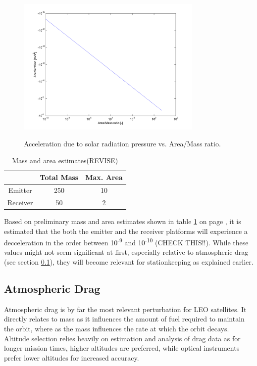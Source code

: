 \begin{figure}[h!]
\centering
\includegraphics[width=0.8\textwidth, angle=0]{img/solPressureVarRatio.png}
\label{fig:solarRadRatio}
\caption{Acceleration due to solar radiation pressure vs. Area/Mass ratio.}
\end{figure}

\begin{table}[h]
	\centering
		\begin{tabular}{c|c|c}
		 & Total Mass & Max. Area \\ \hline \hline
		 Emitter & 250 & 10 \\ 
		 Receiver & 50 & 2 
			
		\end{tabular}
	\caption{Mass and area estimates(REVISE)}
	\label{table:solarEstimates}
\end{table}

Based on preliminary mass and area estimates shown in table \ref{table:solarEstimates} on page \pageref{table:solarEstimates}, it is estimated that the both the emitter and the receiver platforms will experience a decceleration in the order between 10\textsuperscript{-9} and 10\textsuperscript{-10} (CHECK THIS!!). While these values might not seem significant at first, especially relative to atmospheric drag (see section \ref{mtrAtmDrag}), they will become relevant for stationkeeping as explained earlier.

\subsection{Atmospheric Drag}
\label{mtrAtmDrag}

Atmospheric drag is by far the most relevant perturbation for \ac{LEO} satellites. It directly relates to mass as it influences the amount of fuel required to maintain the orbit, where as the mass influences the rate at which the orbit decays. Altitude selection relies heavily on estimation and analysis of drag data as for longer mission times, higher altitudes are preferred, while optical instruments prefer lower altitudes for increased accuracy.

